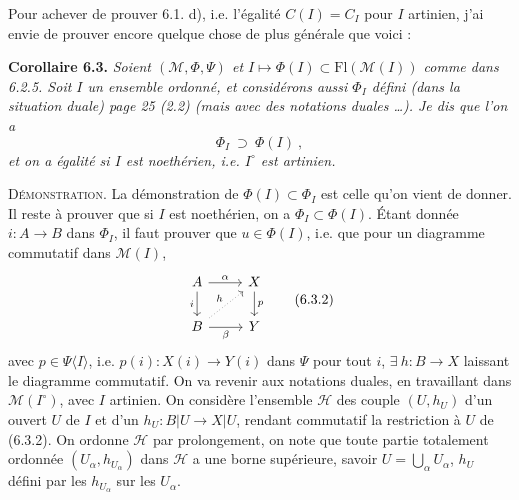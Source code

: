 Pour achever de prouver 6.1. d), i.e. l'égalité $C(I) = C_I$ pour $I$ artinien, j'ai envie de prouver encore quelque chose de plus générale que voici : %

\textbf{Corollaire 6.3.} \textit{Soient $(\mathcal{M}, \Phi, \Psi)$ et $I \longmapsto \Phi(I) \subset \mathrm{Fl}(\mathcal{M}(I))$ comme dans \textup{6.2.5.} Soit $I$ un ensemble ordonné, et considérons aussi $\Phi_I$ défini (dans la situation duale) page \textup{25 (2.2)} (mais avec des notations duales \dots). Je dis que l'on a}
\[
\Phi_I \ \supset\ \Phi(I)\ ,
\tag*{(6.3.1)}
\]
\textit{et on a égalité si $I$ est noethérien, i.e. $I^{\circ}$ est artinien.}

\textsc{Démonstration}. La démonstration de $\Phi(I) \subset \Phi_I$ est celle qu'on vient de donner. Il reste à prouver que si $I$ est noethérien, on a $\Phi_I \subset \Phi(I)$. Étant donnée $i : A \longrightarrow B$ dans $\Phi_I$, il faut prouver que $u \in \Phi(I)$, %
i.e. que pour un diagramme commutatif dans $\mathcal{M}(I)$,
\[
\begin{tikzcd}
A \arrow[r, "\alpha"] \arrow[d, "i"'] & X \arrow[d, "p"] \\
B \arrow[r, "\beta"'] \arrow[ur, dotted, "h"] & Y
\end{tikzcd}
\tag*{(6.3.2)}
\]
avec $p \in \Psi\langle I\rangle$, i.e. $p(i) : X(i) \longrightarrow Y(i)$ dans $\Psi$ pour tout $i$, $\exists\ h : B \longrightarrow X$ laissant le diagramme commutatif. On va revenir aux notations duales, en travaillant dans $\mathcal{M}(I^{\circ})$, avec $I$ artinien. On considère l'ensemble $\mathcal{H}$ des couple %
$(U, h_U)$ d'un ouvert $U$ de $I$ et d'un $h_U : B|U \longrightarrow X|U$, rendant commutatif la restriction à $U$ de (6.3.2). %
On ordonne $\mathcal{H}$ par prolongement, on note que toute partie totalement ordonnée $(U_\alpha, h_{U_\alpha})$ dans $\mathcal{H}$ a une borne supérieure, savoir $U = \bigcup_\alpha U_\alpha$, $h_U$ défini par les $h_{U_\alpha}$ sur les $U_\alpha$.

